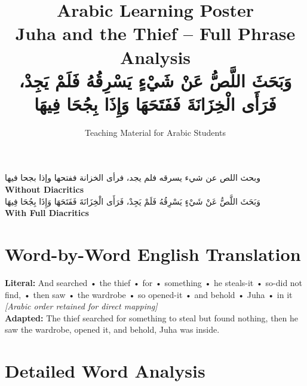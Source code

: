 \documentclass[a4paper,12pt]{article}
\begin{document}
\title{\textbf{\Large Arabic Learning Poster}\\
\large Juha and the Thief – Full Phrase Analysis\\
\normalsize \textarabic{وَبَحَثَ اللَّصُّ عَنْ شَيْءٍ يَسْرِقُهُ فَلَمْ يَجِدْ، فَرَأَى الْخِزَانَةَ فَفَتَحَهَا وَإِذَا بِجُحَا فِيهَا}}
\author{Teaching Material for Arabic Students}
\date{}
\maketitle

\begin{tcolorbox}[colback=boxcolor,colframe=headercolor,title=\textbf{Arabic Text Analysis}]
\centering
\textarabic{وبحث اللص عن شيء يسرقه فلم يجد، فرأى الخزانة ففتحها وإذا بجحا فيها}
\\[0.5em]
\textbf{Without Diacritics}
\\[1em]
\textarabic{وَبَحَثَ اللَّصُّ عَنْ شَيْءٍ يَسْرِقُهُ فَلَمْ يَجِدْ، فَرَأَى الْخِزَانَةَ فَفَتَحَهَا وَإِذَا بِجُحَا فِيهَا}
\\[0.5em]
\textbf{With Full Diacritics}
\end{tcolorbox}

\section{Word-by-Word English Translation}
\begin{tcolorbox}[colback=white,colframe=accentcolor]
\textbf{Literal:} And searched • the thief • for • something • he steals-it • so-did not find, • then saw • the wardrobe • so opened-it • and behold • Juha • in it \\
\textit{[Arabic order retained for direct mapping]}\\[0.5em]
\textbf{Adapted:} The thief searched for something to steal but found nothing, then he saw the wardrobe, opened it, and behold, Juha was inside.
\end{tcolorbox}

\section{Detailed Word Analysis}
\end{document}
